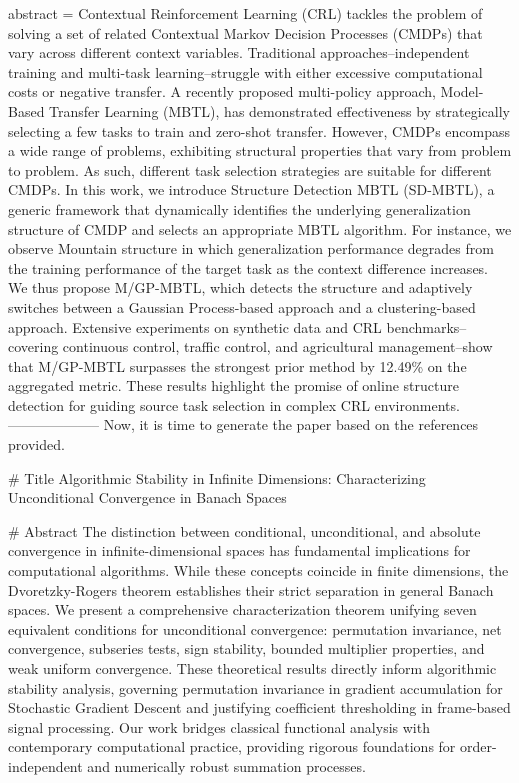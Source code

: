 {      abstract = {Contextual Reinforcement Learning (CRL) tackles the problem of solving a set of related Contextual Markov Decision Processes (CMDPs) that vary across different context variables. Traditional approaches--independent training and multi-task learning--struggle with either excessive computational costs or negative transfer. A recently proposed multi-policy approach, Model-Based Transfer Learning (MBTL), has demonstrated effectiveness by strategically selecting a few tasks to train and zero-shot transfer. However, CMDPs encompass a wide range of problems, exhibiting structural properties that vary from problem to problem. As such, different task selection strategies are suitable for different CMDPs. In this work, we introduce Structure Detection MBTL (SD-MBTL), a generic framework that dynamically identifies the underlying generalization structure of CMDP and selects an appropriate MBTL algorithm. For instance, we observe Mountain structure in which generalization performance degrades from the training performance of the target task as the context difference increases. We thus propose M/GP-MBTL, which detects the structure and adaptively switches between a Gaussian Process-based approach and a clustering-based approach. Extensive experiments on synthetic data and CRL benchmarks--covering continuous control, traffic control, and agricultural management--show that M/GP-MBTL surpasses the strongest prior method by 12.49\% on the aggregated metric. These results highlight the promise of online structure detection for guiding source task selection in complex CRL environments.}
}
        --------------------
         Now, it is time to generate the paper based on the references provided.



# Title
Algorithmic Stability in Infinite Dimensions: Characterizing Unconditional Convergence in Banach Spaces

# Abstract
The distinction between conditional, unconditional, and absolute convergence in infinite-dimensional spaces has fundamental implications for computational algorithms. While these concepts coincide in finite dimensions, the Dvoretzky-Rogers theorem establishes their strict separation in general Banach spaces. We present a comprehensive characterization theorem unifying seven equivalent conditions for unconditional convergence: permutation invariance, net convergence, subseries tests, sign stability, bounded multiplier properties, and weak uniform convergence. These theoretical results directly inform algorithmic stability analysis, governing permutation invariance in gradient accumulation for Stochastic Gradient Descent and justifying coefficient thresholding in frame-based signal processing. Our work bridges classical functional analysis with contemporary computational practice, providing rigorous foundations for order-independent and numerically robust summation processes.

